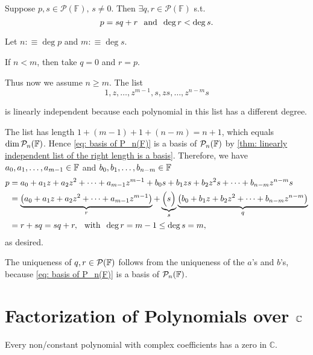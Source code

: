 \setcounter{thm}{8}
\begin{thm}
  \label{division-algorithm-for-polynomials}
  Suppose $p,s \in \mathcal{P} (\mathbb{F}), \, s\neq 0$. 
  Then $\exists q,r \in \mathcal{P} (\mathbb{F})$ s.t.
  \begin{equation}
    p=sq+r \;\;\, \text{and}\;\; \deg r < \deg s.
  \end{equation}
\end{thm}
\begin{prf}
  Let $n:\equiv \deg p$ and $m:\equiv \deg s$. 
  
  If $n<m$, then take $q=0$ and $r=p$.
  
  Thus now we assume $n \geq m$. The list
  \begin{equation}
    \label{eq: basis of P_n(F)}
    1, z, \ldots, z^{m-1}, s, zs, \ldots, z^{n-m}s
  \end{equation}
  
  is linearly independent because each polynomial in this list has a different degree.
  
  The list has length $1+(m-1)+1+(n-m)=n+1$, which equals $\dim \mathcal{P}_n(\mathbb{F})$. Hence \eqref{eq: basis of P_n(F)} is a basis of $\mathcal{P}_n(\mathbb{F})$ by \ref{thm: linearly independent list of the right length is a basis}. Therefore, we have $a_0, a_1, \ldots, a_{m-1} \in \mathbb{F}$ and $b_0, b_1, \ldots, b_{n-m} \in \mathbb{F}$  \st
  \begin{equation}
    \begin{aligned}
          p&=a_0 + a_1z + a_2z^2 + \cdots + a_{m-1} z^{m-1}
          + b_0 s + b_1 zs + b_2 z^2 s + \cdots + b_{n-m}z^{n-m}s \\
           &=\underbrace{\left(a_0 + a_1z + a_2z^2 + \cdots + a_{m-1} z^{m-1} \right)}_{r} + \underbrace{\Big(s\Big)}_{s} \underbrace{\left( b_0 + b_1 z + b_2 z^2 + \cdots + b_{n-m} z^{n-m} \right)}_{q} \\
           &=r+sq=sq+r, \;\;\, \text{with}\;\; \deg r = m-1 \leq \deg s = m,
    \end{aligned}
  \end{equation}
  as desired.
  
  The uniqueness of $q,r \in \mathcal{P}(\mathbb{F})$ follows from the uniqueness of the $a$'s and $b$'s, because \eqref{eq: basis of P_n(F)} is a basis of $\mathcal{P}_n(\mathbb{F})$.
\end{prf}
\section{Factorization of Polynomials over $\mathbb{C}$}
\setcounter{thm}{11}
\begin{thm}
  \label{fundamental-theorem-of-algebra-first-version}
  Every non\-/constant polynomial with complex coefficients has a zero in $\mathbb{C}$.
\end{thm}

